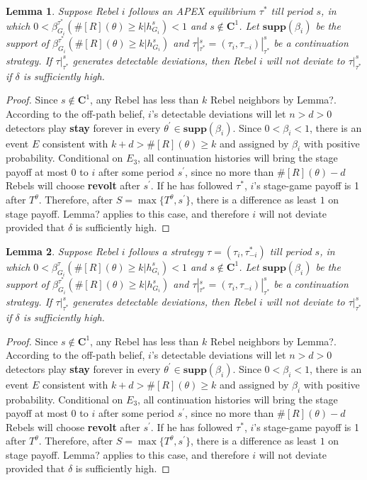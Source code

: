 \documentclass[12pt,letter]{article}
\newcommand{\Kappa}{\mathbf{C}}
\newtheorem{lemma}{Lemma}[section]
\theoremstyle{definition}
\theoremstyle{remark}
\theoremstyle{claim}
\begin{document}
\begin{lemma}
Suppose Rebel $i$ follows an APEX equilibrium $\tau^{*}$ till period $s$, in which $0<\beta^{\tau^{*}}_{G_i}(\#[R](\theta)\geq k|h^s_{G_i})< 1$ and $s\not\in \Kappa^1$. Let $\mathbf{supp}(\beta_i)$ be the support of $\beta^{\tau^{*}}_{G_i}(\#[R](\theta)\geq k|h^s_{G_i})$ and $\tau|^s_{\tau^{*}}=(\tau_i,\tau_{-i})|^s_{\tau^{*}}$ be a continuation strategy. If $\tau|^s_{\tau^{*}}$ generates detectable deviations, then Rebel $i$ will not deviate to $\tau|^s_{\tau^{*}}$ if $\delta$ is sufficiently high. 
\end{lemma}
\begin{proof}
Since $s\not\in \Kappa^1$, any Rebel has less than $k$ Rebel neighbors by Lemma?. According to the off-path belief, $i$'s detectable deviations will let $n>d>0$ detectors play \textbf{stay} forever in every $\theta^{'}\in \mathbf{supp}(\beta_i)$. Since $0<\beta_i<1$, there is an event $E$ consistent with $k+d>\#[R](\theta)\geq k$ and assigned by $\beta_i$ with positive probability. Conditional on $E_3$, all continuation histories will bring the stage payoff at most 0 to $i$ after some period $s^{'}$, since no more than $\#[R](\theta)-d$ Rebels will choose \textbf{revolt} after $s^{'}$. If he has followed $\tau^{*}$, $i$'s stage-game payoff is 1 after $T^{\theta}$. Therefore, after $S=\max\{T^{\theta}, s^{'}\}$, there is a difference as least $1$ on stage payoff. Lemma? applies to this case, and therefore $i$ will not deviate provided that $\delta$ is sufficiently high.
\end{proof}


\begin{lemma}
Suppose Rebel $i$ follows a strategy $\tau=(\tau_i,\tau^{*}_{-i})$ till period $s$, in which $0<\beta^{\tau}_{G_i}(\#[R](\theta)\geq k|h^s_{G_i})< 1$ and $s\not\in \Kappa^1$. Let $\mathbf{supp}(\beta_i)$ be the support of $\beta^{\tau^{*}}_{G_i}(\#[R](\theta)\geq k|h^s_{G_i})$ and $\tau|^s_{\tau^{*}}=(\tau_i,\tau_{-i})|^s_{\tau^{*}}$ be a continuation strategy. If $\tau|^s_{\tau^{*}}$ generates detectable deviations, then Rebel $i$ will not deviate to $\tau|^s_{\tau^{*}}$ if $\delta$ is sufficiently high. 
\end{lemma}
\begin{proof}
Since $s\not\in \Kappa^1$, any Rebel has less than $k$ Rebel neighbors by Lemma?. According to the off-path belief, $i$'s detectable deviations will let $n>d>0$ detectors play \textbf{stay} forever in every $\theta^{'}\in \mathbf{supp}(\beta_i)$. Since $0<\beta_i<1$, there is an event $E$ consistent with $k+d>\#[R](\theta)\geq k$ and assigned by $\beta_i$ with positive probability. Conditional on $E_3$, all continuation histories will bring the stage payoff at most 0 to $i$ after some period $s^{'}$, since no more than $\#[R](\theta)-d$ Rebels will choose \textbf{revolt} after $s^{'}$. If he has followed $\tau^{*}$, $i$'s stage-game payoff is 1 after $T^{\theta}$. Therefore, after $S=\max\{T^{\theta}, s^{'}\}$, there is a difference as least $1$ on stage payoff. Lemma? applies to this case, and therefore $i$ will not deviate provided that $\delta$ is sufficiently high.
\end{proof}
\end{document}
